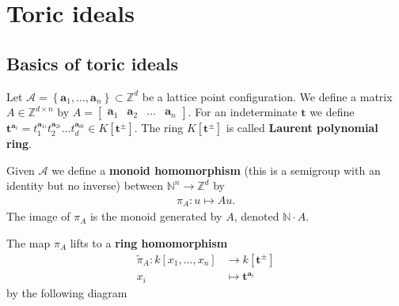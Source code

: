 \documentclass[a4paper, 11pt]{article}
\begin{document}
\clearpage
\section{Toric ideals}

\subsection{Basics of toric ideals}


Let \( \mathcal{A} = \left\{ \mathbf a_1, \dots,  \mathbf a_n \right\} \subset \mathbb Z^d \) be a lattice point configuration. We define a matrix \( A \in \mathbb Z^{d \times n} \) by \( A = \begin{bmatrix}
  \mathbf a_1 & \mathbf  a_2 & \dots & \mathbf a_n
\end{bmatrix}\).
For an indeterminate \( \mathbf t \) we define \( \mathbf t^{\mathbf a_i} = t_1^{\mathbf a_{1i}} t_2^{\mathbf a_{2i}} \dots t_d^{\mathbf a_{di}} \in K[\mathbf t^{\pm}] \). The ring \( K[\mathbf t^{\pm}] \) is called \textbf{Laurent polynomial ring}.

Given \( \mathcal{A} \) we define a \textbf{monoid homomorphism} (this is a semigroup with an identity but no inverse) between \( \mathbb N^n \to \mathbb Z^d \) by 
\begin{align*}
  \pi_A:  u \mapsto Au.
\end{align*}
The image of \( \pi_A \) is the monoid generated by \( A \), denoted \( \mathbb N \cdot A \).

The map \( \pi_A \) lifts to a \textbf{ring homomorphism} 
\begin{align*}
 \tilde \pi_A:  k[x_1,..., x_n] &\to k[\mathbf t^{\pm}] \\
  x_i &\mapsto \mathbf t^{\mathbf a_i}
\end{align*}
by the following diagram
\begin{figure}[H]
  \centering
\end{figure}
\end{document}

